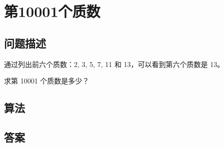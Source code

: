 \section{第10001个质数}
\subsection{问题描述}
\begin{tcolorbox}
通过列出前六个质数：2, 3, 5, 7, 11 和 13，可以看到第六个质数是 13。

求第 10001 个质数是多少？
\end{tcolorbox}

\subsection{算法}

\subsection{答案}
